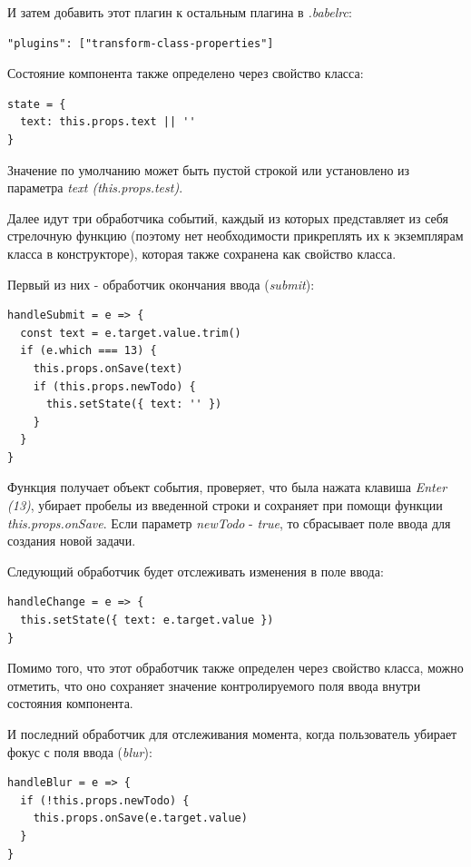 И затем добавить этот плагин к остальным плагина в \textit{.babelrc}:

\begin{lstlisting}
"plugins": ["transform-class-properties"]
\end{lstlisting}

Состояние компонента также определено через свойство класса:

\begin{lstlisting}
state = {
  text: this.props.text || ''
}
\end{lstlisting}

Значение по умолчанию может быть пустой строкой или установлено из параметра \textit{text (this.props.test)}.

Далее идут три обработчика событий, каждый из которых представляет из себя стрелочную функцию (поэтому нет необходимости прикреплять их к экземплярам класса в конструкторе), которая также сохранена как свойство класса. 

Первый из них - обработчик окончания ввода (\textit{submit}):

\begin{lstlisting}
handleSubmit = e => {
  const text = e.target.value.trim()
  if (e.which === 13) {
    this.props.onSave(text)
    if (this.props.newTodo) {
      this.setState({ text: '' })
    }
  }
}
\end{lstlisting}

Функция получает объект события, проверяет, что была нажата клавиша \textit{Enter (13)}, убирает пробелы из введенной строки и сохраняет при помощи функции \textit{this.props.onSave}. Если параметр \textit{newTodo} - \textit{true}, то сбрасывает поле ввода для создания новой задачи.

Следующий обработчик будет отслеживать изменения в поле ввода:

\begin{lstlisting}
handleChange = e => {
  this.setState({ text: e.target.value })
}
\end{lstlisting}

Помимо того, что этот обработчик также определен через свойство класса, можно отметить, что оно сохраняет значение контролируемого поля ввода внутри состояния компонента.

И последний обработчик для отслеживания момента, когда пользователь убирает фокус с поля ввода (\textit{blur}):

\begin{lstlisting}
handleBlur = e => {
  if (!this.props.newTodo) {
    this.props.onSave(e.target.value)
  }
}
\end{lstlisting}

